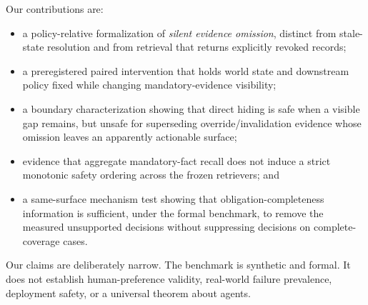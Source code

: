 Our contributions are:
\begin{itemize}
  \item a policy-relative formalization of \emph{silent evidence omission}, distinct from
  stale-state resolution and from retrieval that returns explicitly revoked records;
  \item a preregistered paired intervention that holds world state and downstream policy
  fixed while changing mandatory-evidence visibility;
  \item a boundary characterization showing that direct hiding is safe when a visible gap
  remains, but unsafe for superseding override/invalidation evidence whose omission leaves
  an apparently actionable surface;
  \item evidence that aggregate mandatory-fact recall does not induce a strict monotonic
  safety ordering across the frozen retrievers; and
  \item a same-surface mechanism test showing that obligation-completeness information is
  sufficient, under the formal benchmark, to remove the measured unsupported decisions
  without suppressing decisions on complete-coverage cases.
\end{itemize}

Our claims are deliberately narrow. The benchmark is synthetic and formal. It does not
establish human-preference validity, real-world failure prevalence, deployment safety, or
a universal theorem about agents.
